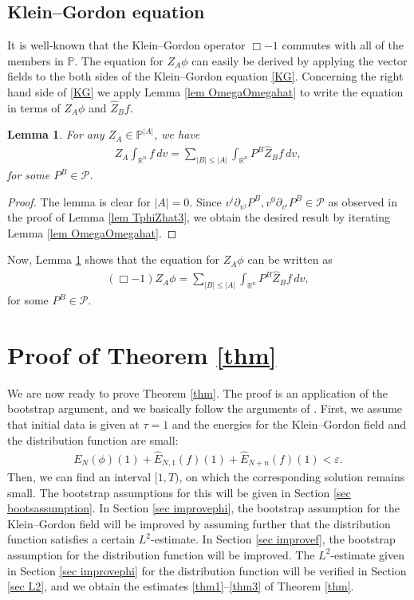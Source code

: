 \documentclass{article}
\newtheorem{lemma}{Lemma}[section]
\newcommand{\bbr}{{\mathbb R}}
\newcommand{\bbp}{{\mathbb P}}
\newcommand{\bbrn}{{\bbr^n}}
\newcommand{\cP}{{\mathcal P}}
\begin{document}
%
\subsection{Klein--Gordon equation} \label{sec commutationphi}
It is well-known that the Klein--Gordon operator $ \Box - 1 $ commutes with all of the members in $ \bbp $. The equation for $ Z_A \phi $ can easily be derived by applying the vector fields to the both sides of the Klein--Gordon equation \eqref{KG}. Concerning the right hand side of \eqref{KG} we apply Lemma \ref{lem OmegaOmegahat} to write the equation in terms of $ Z_A \phi $ and $ \hat{ Z }_B f $.

%
\begin{lemma} \label{lem Zintf}
For any $ Z_A \in \bbp^{ | A | } $, we have
\begin{align*}
Z_A \int_\bbrn f \, d v = \sum_{ | B | \leq | A | } \int_\bbrn P^B \hat{ Z }_B f \, d v ,
\end{align*}
for some $ P^B \in \cP $.
\end{lemma}
\begin{proof}
The lemma is clear for $ | A | = 0 $. Since $ v^i \partial_{ v^j } P^B , v^0 \partial_{ v^i } P^B \in \cP $ as observed in the proof of Lemma \ref{lem TphiZhat3}, we obtain the desired result by iterating Lemma \ref{lem OmegaOmegahat}.
\end{proof}

Now, Lemma \ref{lem Zintf} shows that the equation for $ Z_A \phi $ can be written as
\begin{align}
( \Box - 1 ) Z_A \phi = \sum_{ | B | \leq | A | } \int_{ \bbr^n } P^B \hat{ Z }_B f \, d v , \label{ZKG}
\end{align}
for some $ P^B \in \cP $.




%
\section{Proof of Theorem \ref{thm}} \label{sec proof}
We are now ready to prove Theorem \ref{thm}. The proof is an application of the bootstrap argument, and we basically follow the arguments of \cite{FJS17}. First, we assume that initial data is given at $ \tau = 1 $ and the energies for the Klein--Gordon field and the distribution function are small:
\begin{align}
E_N ( \phi ) ( 1 ) + \hat{ E }_{ N, 1 } ( f ) ( 1 ) + \hat{ E }_{ N + n } ( f ) ( 1 ) < \varepsilon . \label{smalldata}
\end{align}
Then, we can find an interval $ [ 1 , T ) $, on which the corresponding solution remains small. The bootstrap assumptions for this will be given in Section \ref{sec bootsassumption}. In Section \ref{sec improvephi}, the bootstrap assumption for the Klein--Gordon field will be improved by assuming further that the distribution function satisfies a certain $ L^2 $-estimate. In Section \ref{sec improvef}, the bootstrap assumption for the distribution function will be improved. The $ L^2 $-estimate given in Section \ref{sec improvephi} for the distribution function will be verified in Section \ref{sec L2}, and we obtain the estimates \eqref{thm1}--\eqref{thm3} of Theorem \ref{thm}.
\end{document}
